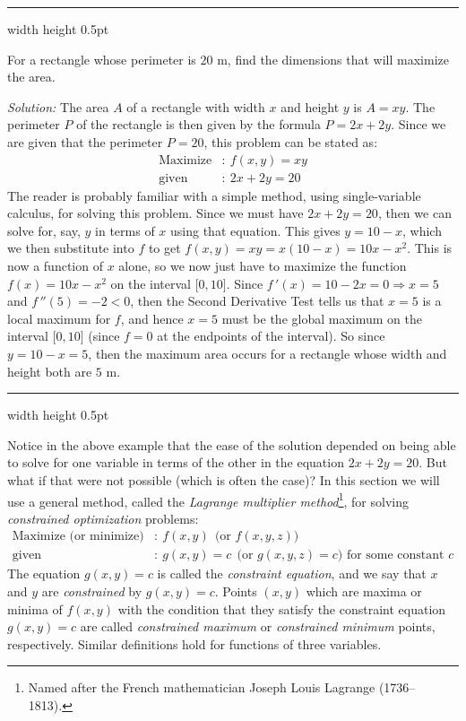 \vspace{3mm}
\hrule width \textwidth height 0.5pt
\begin{exmp}\label{exmp:consimple}
 For a rectangle whose perimeter is $20$ m, find the dimensions that will maximize the area.\vspace{1mm}
 \par\noindent \emph{Solution:} The area $A$ of a rectangle with width $x$ and height $y$ is $A = xy$. The perimeter $P$
 of the rectangle is then given by the formula $P = 2x + 2y$. Since we are given that the perimeter $P = 20$, this
 problem can be stated as:
 \begin{align*}
  \text{Maximize}&: ~ f(x,y) = xy\\
  \text{given}&: ~ 2x + 2y = 20
 \end{align*}
 The reader is probably familiar with a simple method, using single-variable calculus, for solving this problem. Since
 we must have $2x+2y=20$, then we can solve for, say, $y$ in terms of $x$ using that equation. This gives $y = 10 - x$,
 which we then substitute into $f$ to get $f(x,y) = xy = x(10-x) = 10x - x^2$. 
 This is now a function of $x$ alone, so
 we now just have to maximize the function $f(x) = 10x - x^2$ on the interval $\lbrack 0, 10 \rbrack$. Since
 $f\,'(x) = 10-2x = 0 \Rightarrow x =5$ and $f\,''(5) = -2 < 0$, then the Second Derivative Test tells us that $x=5$ is
 a local maximum for $f$, and hence $x=5$ must be the global maximum on the interval $\lbrack 0, 10 \rbrack$ (since
 $f = 0$ at the endpoints of the interval). 
 So since $y=10-x =5$, then the maximum area occurs for a rectangle whose
 width and height both are $5$ m.
\end{exmp}
\hrule width \textwidth height 0.5pt
\vspace{3mm}

Notice in the above example that the ease of the solution depended on being able to solve for one variable in terms of the other in the equation $2x+2y=20$. 
But what if that were not possible (which is often the case)?
In this section we will use a general method, called the
\emph{Lagrange multiplier method}\footnote{Named after the French mathematician Joseph Louis Lagrange (1736--1813).}, for
solving \emph{constrained optimization} problems:
\begin{align*}
 \text{Maximize (or minimize)}&: ~ f(x,y) ~~\text{(or $f(x,y,z)$)}\\
 \text{given}&: ~ g(x,y) = c ~~\text{(or $g(x,y,z) = c$) for some constant $c$}
\end{align*}
The equation $g(x,y) = c$ is called the \emph{constraint equation}, and we say that $x$ and $y$ are \emph{constrained}
by $g(x,y) = c$. Points $(x,y)$ which are maxima or minima of $f(x,y)$ with the condition that they satisfy
the constraint equation $g(x,y)=c$ are called \emph{constrained maximum} or \emph{constrained minimum} points,
respectively. Similar definitions hold for functions of three variables.

